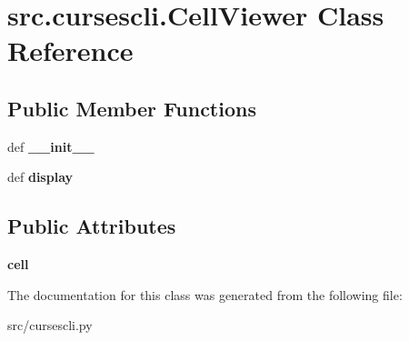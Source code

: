 \hypertarget{classsrc_1_1cursescli_1_1_cell_viewer}{\section{src.\-cursescli.\-Cell\-Viewer \-Class \-Reference}
\label{classsrc_1_1cursescli_1_1_cell_viewer}
}
\subsection*{\-Public \-Member \-Functions}
\begin{DoxyCompactItemize}
\item 
\hypertarget{classsrc_1_1cursescli_1_1_cell_viewer_aaad19bbe5ea257eebc601041aa687c9f}{def {\bfseries \-\_\-\-\_\-init\-\_\-\-\_\-}}\label{classsrc_1_1cursescli_1_1_cell_viewer_aaad19bbe5ea257eebc601041aa687c9f}

\item 
\hypertarget{classsrc_1_1cursescli_1_1_cell_viewer_a1bddc8a473696ecb4b23135ffefa1f5a}{def {\bfseries display}}\label{classsrc_1_1cursescli_1_1_cell_viewer_a1bddc8a473696ecb4b23135ffefa1f5a}

\end{DoxyCompactItemize}
\subsection*{\-Public \-Attributes}
\begin{DoxyCompactItemize}
\item 
\hypertarget{classsrc_1_1cursescli_1_1_cell_viewer_a8a7327975f255506a724ae857a2a6635}{{\bfseries cell}}\label{classsrc_1_1cursescli_1_1_cell_viewer_a8a7327975f255506a724ae857a2a6635}

\end{DoxyCompactItemize}


\-The documentation for this class was generated from the following file\-:\begin{DoxyCompactItemize}
\item 
src/cursescli.\-py\end{DoxyCompactItemize}
